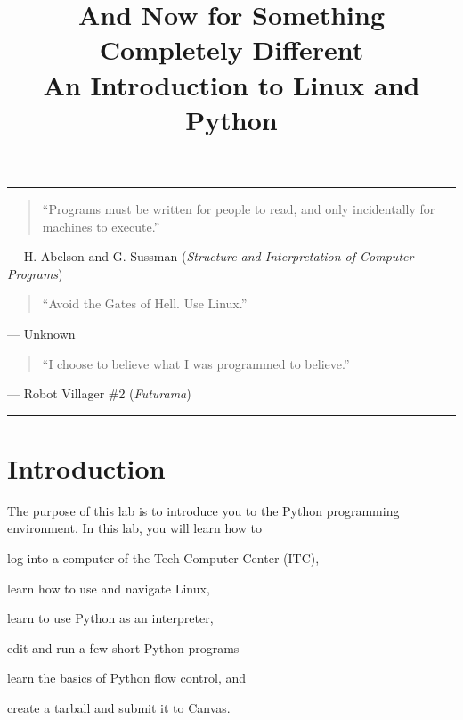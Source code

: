 \documentclass[11pt]{cselabheader}
\title{And Now for Something Completely Different\\
  {\large An Introduction to Linux and Python}}
\begin{document}
\maketitle

\hrule

\begin{quotation}
  ``Programs must be written for people to read, and only incidentally for
  machines to execute.''
\end{quotation}
\begin{flushright}
--- H. Abelson and G. Sussman (\textit{Structure and Interpretation of Computer
Programs})
\end{flushright}

\begin{quotation}
``Avoid the Gates of Hell. Use Linux.''
\end{quotation}
\begin{flushright}
--- Unknown
\end{flushright}

\begin{quotation}
``I choose to believe what I was programmed to believe.''
\end{quotation}
\begin{flushright}
  --- Robot Villager \#2 (\textit{Futurama})
\end{flushright}

\hrule
\section{Introduction}

The purpose of this lab is to introduce you to the Python programming
environment. In this lab, you will learn how to
\begin{enumerate*}
  \item log into a computer of the Tech Computer Center (ITC),
  \item learn how to use and navigate Linux,
  \item learn to use Python as an interpreter,
  \item edit and run a few short Python programs
  \item learn the basics of Python flow control, and
  \item create a tarball and submit it to Canvas.
\end{enumerate*}
\end{document}
